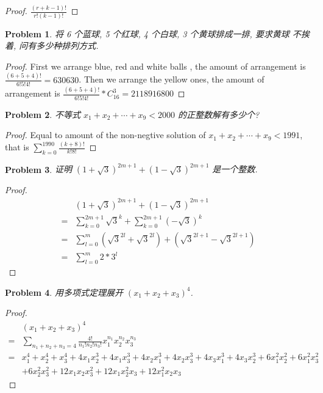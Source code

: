 \documentclass{ctexart}
\newtheorem{problem}{\textbf{Problem}}
\renewcommand{\(}{\left(}
\renewcommand{\)}{\right)}
\begin{document}
\begin{proof}
$\frac{(r+k-1)!}{r!(k-1)!}$
\end{proof}
\begin{problem}
 将 6 个蓝球, 5 个红球, 4 个白球, 3 个黄球排成一排, 要求黄球 不挨着, 问有多少种排列方式.
\end{problem}
\begin{proof}
    First we arrange blue, red and white balls , the amount of arrangement is $\frac{(6+5+4)!}{6!5!4!}=630630$. Then we arrange the yellow ones,  the amount of arrangement is $\frac{(6+5+4)!}{6!5!4!}*C_{16}^{3}=2118916800$
\end{proof}
\begin{problem}
    不等式 $x_1+x_2+\cdots+x_9<2000$ 的正整数解有多少个?
\end{problem}
\begin{proof}
    Equal to amount of the non-negtive solution of $x_1+x_2+\cdots+x_9<1991$, that is $\sum_{k=0}^{1990}\frac{(k+8)!}{k!8!}$ 
\end{proof}
\begin{problem}
    证明 $(1+\sqrt{3})^{2 m+1}+(1-\sqrt{3})^{2 m+1}$ 是一个整数.
\end{problem}
\begin{proof}
\begin{equation}
\begin{aligned}
&(1+\sqrt{3})^{2 m+1}+(1-\sqrt{3})^{2 m+1}\\
=&\sum_{k=0}^{2m+1}\sqrt{3}^k+\sum_{k=0}^{2m+1}(-\sqrt{3})^k\\
=&\sum_{l=0}^{m}(\sqrt{3}^{2l}+\sqrt{3}^{2l})+(\sqrt{3}^{2l+1}-\sqrt{3}^{2l+1})\\
=&\sum_{l=0}^{m}2*3^l
\end{aligned}
\end{equation}
\end{proof}
\begin{problem}
    用多项式定理展开 $\left(x_1+x_2+x_3\right)^4$.
\end{problem}
\begin{proof}
    \begin{equation}
        \begin{aligned}
           & \left(x_1+x_2+x_3\right)^4\\
           =&\sum_{n_1+n_2+n_3=4}\frac{4!}{n_1!n_2!n_3!}x_1^{n_1}x_2^{n_2}x_3^{n_3}\\
           =&x_1^4+x_2^4+x_3^4+4x_1x_2^3+4x_1x_3^3+4x_2x_1^3+4x_2x_3^3+4x_3x_1^3+4x_3x_2^3+6x_1^2x_2^2+6x_1^2x_3^2\\
           &+6x_2^2x_3^2+12x_1x_2x_3^2+12x_1x_2^2x_3+12x_1^2x_2x_3
        \end{aligned}
    \end{equation}
\end{proof}
\end{document}
